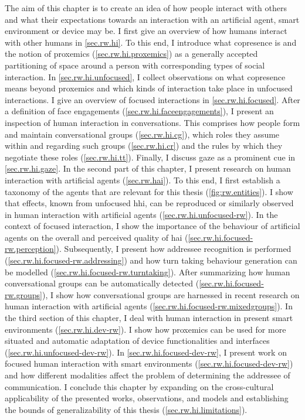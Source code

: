 The aim of this chapter is to create an idea of how people interact with others and what their expectations towards an interaction with an \gls{artificial agent}, \gls{smart environment} or \gls{device} may be.
I first give an overview of how humans interact with other humans in \cref{sec.rw.hi}.
To this end, I introduce what \gls{copresence} is and the notion of \gls{proxemics} (\cref{sec.rw.hi.proxemics}) as a generally accepted partitioning of space around a person with corresponding types of social interaction.
In \cref{sec.rw.hi.unfocused}, I collect observations on what \gls{copresence} means beyond \gls{proxemics} and which kinds of interaction take place in \glspl{unfocused interaction}.
I give an overview of \glspl{focused interaction} in \cref{sec.rw.hi.focused}.
After a definition of \glspl{face engagement} (\cref{sec.rw.hi.faceengagements}), I present an inspection of human interaction in \glspl{conversation}.
This comprises how people form and maintain \glspl{conversational group} (\cref{sec.rw.hi.cg}), which roles they assume within and regarding such groups (\cref{sec.rw.hi.cr}) and the rules by which they negotiate these roles (\cref{sec.rw.hi.tt}).
Finally, I discuss gaze as a prominent  cue in \cref{sec.rw.hi.gaze}.
In the second part of this chapter, I present research on human interaction with \glspl{artificial agent} (\cref{sec.rw.hai}).
To this end, I first establish a taxonomy of the agents that are relevant for this thesis (\cref{fig:rw.entities}).
I show that effects, known from unfocused \gls{hhi}, can be reproduced or similarly observed in human interaction with \glspl{artificial agent} (\cref{sec.rw.hi.unfocused-rw}).
In the context of \gls{focused interaction}, I show the importance of the behaviour of \glspl{artificial agent} on the overall and perceived quality of \gls{hai} (\cref{sec.rw.hi.focused-rw.perception}).
Subsequently, I present how \gls{addressee} recognition is performed (\cref{sec.rw.hi.focused-rw.addressing}) and how \gls{turn taking} behaviour generation can be modelled (\cref{sec.rw.hi.focused-rw.turntaking}).
After summarizing how human \glspl{conversational group} can be automatically detected (\cref{sec.rw.hi.focused-rw.groups}), I show how \glspl{conversational group} are harnessed in recent research on human interaction with \glspl{artificial agent} (\cref{sec.rw.hi.focused-rw.mixedgroups}).
In the third section of this chapter, I deal with human interaction in present \glspl{smart environment} (\cref{sec.rw.hi.dev-rw}).
I show how \gls{proxemics} can be used for more situated and automatic adaptation of \gls{device} functionalities and interfaces (\cref{sec.rw.hi.unfocused-dev-rw}).
In \cref{sec.rw.hi.focused-dev-rw}, I present work on focused human interaction with \glspl{smart environment} (\cref{sec.rw.hi.focused-dev-rw}) and how different modalities affect the problem of determining the \gls{addressee} of communication.
I conclude this chapter by expanding on the cross-cultural applicability of the presented works, observations, and models and establishing the bounds of generalizability of this thesis (\cref{sec.rw.hi.limitations}).
